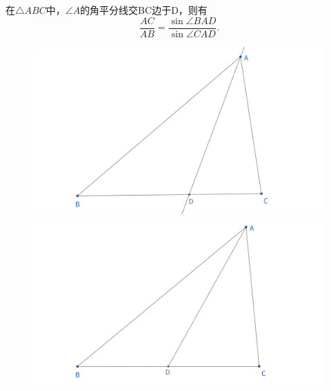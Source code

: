 \begin{proposition}[中线定理]
    在$\triangle ABC$中，$\angle A$的角平分线交BC边于D，则有
    $$
    \frac{AC}{AB} = \frac{\sin \angle BAD}{\sin \angle CAD}.
    $$
\end{proposition}

\begin{figure}[htbp]
    \centering
    \hfill %
    \begin{minipage}[t]{0.45\textwidth}
    \centering
    \includegraphics[width=\linewidth]{figures/分角线定理 -角平分线.png}
    \end{minipage}
    \hfill %
    \begin{minipage}[t]{0.45\textwidth}
    \centering
    \includegraphics[width=\linewidth]{figures/分角线定理-中线.png}
    \end{minipage}
\end{figure}

\newpage 
